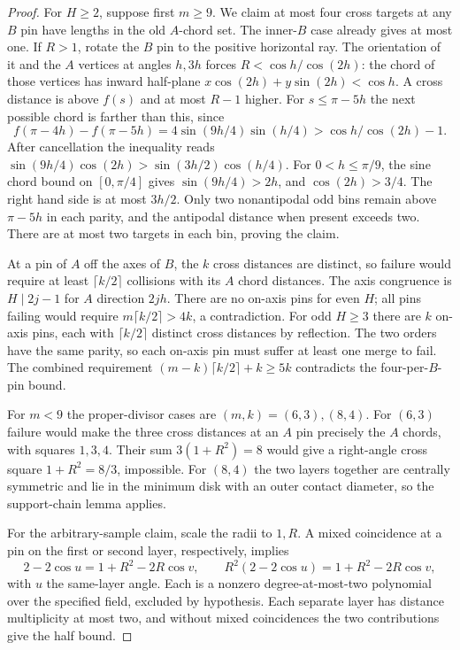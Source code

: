 \begin{proof}
For \(H\ge2\), suppose first \(m\ge9\). We claim at most four cross
targets at any \(B\) pin have lengths in the old \(A\)-chord set.
The inner-\(B\) case already gives at most one. If \(R>1\), rotate
the \(B\) pin to the positive horizontal ray. The orientation of it
and the \(A\) vertices at angles \(h,3h\) forces \(R<\cos h/\cos(2h)\):
the chord of those vertices has inward half-plane
\(x\cos(2h)+y\sin(2h)<\cos h\). A cross distance is above \(f(s)\)
and at most \(R-1\) higher. For \(s\le\pi-5h\) the next possible chord
is farther than this, since
\[
 f(\pi-4h)-f(\pi-5h)=4\sin(9h/4)\sin(h/4)>
 \cos h/\cos(2h)-1 .
\]
After cancellation the inequality reads
\(\sin(9h/4)\cos(2h)>\sin(3h/2)\cos(h/4)\).
For \(0<h\le\pi/9\), the sine chord bound on \([0,\pi/4]\) gives
\(\sin(9h/4)>2h\), and \(\cos(2h)>3/4\). The right hand side is at most
\(3h/2\). Only two nonantipodal odd bins remain above \(\pi-5h\) in
each parity, and the antipodal distance when present exceeds two.
There are at most two targets in each bin, proving the claim.

At a pin of \(A\) off the axes of \(B\), the \(k\) cross distances
are distinct, so failure would require at least \(\lceil k/2\rceil\)
collisions with its \(A\) chord distances. The axis congruence is
\(H\mid 2j-1\) for \(A\) direction \(2jh\). There are no on-axis
pins for even \(H\); all pins failing would require
\(m\lceil k/2\rceil>4k\), a contradiction. For odd \(H\ge3\) there
are \(k\) on-axis pins, each with \(\lceil k/2\rceil\) distinct
cross distances by reflection. The two orders have the same parity,
so each on-axis pin must suffer at least one merge to fail.
The combined requirement \((m-k)\lceil k/2\rceil+k\ge5k\)
contradicts the four-per-\(B\)-pin bound.

For \(m<9\) the proper-divisor cases are \((m,k)=(6,3),(8,4)\).
For \((6,3)\) failure would make the three cross distances at an \(A\)
pin precisely the \(A\) chords, with squares \(1,3,4\).
Their sum \(3(1+R^2)=8\) would give a right-angle cross square
\(1+R^2=8/3\), impossible. For \((8,4)\) the two layers together
are centrally symmetric and lie in the minimum disk with an
outer contact diameter, so the support-chain lemma applies.

For the arbitrary-sample claim, scale the radii to \(1,R\).
A mixed coincidence at a pin on the first or second layer,
respectively, implies
\[
 2-2\cos u=1+R^2-2R\cos v,\qquad
 R^2(2-2\cos u)=1+R^2-2R\cos v,
\]
with \(u\) the same-layer angle. Each is a nonzero degree-at-most-two
polynomial over the specified field, excluded by hypothesis. Each
separate layer has distance multiplicity at most two, and without
mixed coincidences the two contributions give the half bound.
\end{proof}
